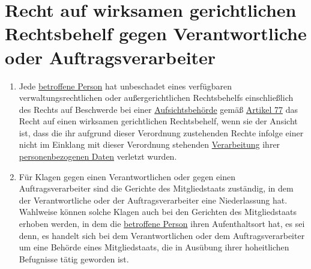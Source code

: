 \chapter{Recht auf wirksamen gerichtlichen Rechtsbehelf gegen Verantwortliche oder Auftragsverarbeiter}
\label{ch:79}


\begin{enumerate}

  \item Jede \hyperref[itm:04-1]{betroffene Person} hat unbeschadet eines verfügbaren verwaltungsrechtlichen oder außergerichtlichen
   Rechtsbehelfs einschließlich des Rechts auf Beschwerde bei einer \hyperref[itm:04-21]{Aufsichtsbehörde} gemäß \hyperref[ch:77]{Artikel 77}
   das Recht auf einen wirksamen gerichtlichen Rechtsbehelf, wenn sie der Ansicht ist, dass die ihr aufgrund dieser
   Verordnung zustehenden Rechte infolge einer nicht im Einklang mit dieser Verordnung stehenden \hyperref[itm:04-2]{Verarbeitung} ihrer
   \hyperref[itm:04-1]{personenbezogenen Daten} verletzt wurden.
  \label{itm:79-1}

  \item Für Klagen gegen einen Verantwortlichen oder gegen einen Auftragsverarbeiter sind die Gerichte des
   Mitgliedstaats zuständig, in dem der Verantwortliche oder der Auftragsverarbeiter eine Niederlassung hat. Wahlweise
   können solche Klagen auch bei den Gerichten des Mitgliedstaats erhoben werden, in dem die \hyperref[itm:04-1]{betroffene Person} ihren
   Aufenthaltsort hat, es sei denn, es handelt sich bei dem Verantwortlichen oder dem Auftragsverarbeiter um eine
   Behörde eines Mitgliedstaats, die in Ausübung ihrer hoheitlichen Befugnisse tätig geworden ist.
  \label{itm:79-2}

\end{enumerate}


